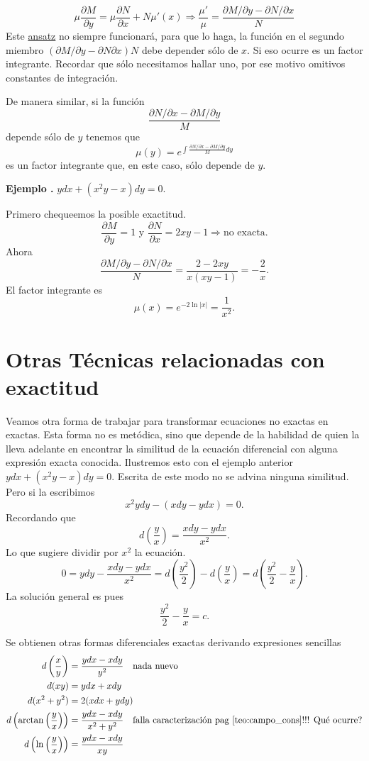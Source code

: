 \documentclass{article}
\newcommand{\der}[2]{\frac{\partial #1}{\partial #2}}
\newcounter{ejemplo_cont}
\newenvironment{ejemplo}{\noindent\textbf{Ejemplo  \arabic{ejemplo_cont}.} }{\addtocounter{ejemplo_cont}{1}}
\begin{document}
\[\mu\der{M}{y}=\mu\der{N}{x}+N\mu'(x) \Longrightarrow\boxed{\frac{\mu'}{\mu}=\frac{\partial M/\partial y-\partial N/\partial x}{N}}\]
Este \href{http://es.wikipedia.org/wiki/Ansatz}{ansatz} no siempre funcionará, para que lo haga,  la función en el segundo miembro $(\partial M/\partial y-\partial N\partial x)N$
debe depender sólo de $x$. Si eso ocurre
es un factor integrante. Recordar que sólo necesitamos hallar uno, por ese motivo omitivos constantes de integración.

De manera similar, si la función
\[\frac{\partial N/\partial x-\partial M/\partial y}{M}\]
depende sólo de $y$ tenemos que
\[\mu(y)=e^{\int \frac{\partial N/\partial x-\partial M/\partial y}{M}dy}\]
es un factor integrante que, en este caso, sólo depende de $y$.

\begin{ejemplo} $ydx+(x^2y-x)dy=0$.
 \end{ejemplo}


Primero chequeemos la posible exactitud.
\[\der{M}{y}=1\text{ y } \der{N}{x}=2xy-1\Longrightarrow\text{no exacta}.\]
Ahora 
\[\frac{\partial M/\partial y-\partial N/\partial x}{N}=\frac{2-2xy}{x(xy-1)}=-\frac{2}{x}.\]
El factor integrante es
\[\mu(x)=e^{-2\ln |x|}=\frac{1}{x^2}.\]




 \section{Otras Técnicas relacionadas con exactitud}

Veamos otra forma de trabajar para transformar ecuaciones no exactas en exactas. Esta forma no es metódica, sino  que depende de la habilidad
de quien la lleva adelante en encontrar la similitud de la ecuación diferencial con alguna expresión exacta conocida. Ilustremos esto con el ejemplo  anterior
$ydx+(x^2y-x)dy=0$. Escrita de este modo no se advina ninguna similitud. Pero si la escribimos
\[x^2ydy-(xdy-ydx)=0.\]
Recordando  que
\[d\left(\frac{y}{x}\right)=\frac{xdy-ydx}{x^2}.\]
Lo que sugiere dividir por $x^2$ la ecuación.
\[0=ydy-\frac{xdy-ydx}{x^2}=d\left(\frac{y^2}{2}\right)-d\left(\frac{y}{x}\right)=d\left(\frac{y^2}{2}-\frac{y}{x}\right).\]
La solución general es pues
\[\frac{y^2}{2}-\frac{y}{x}=c.\]


Se obtienen otras formas diferenciales exactas derivando expresiones sencillas
 \begin{align}
  d\left(\frac{x}{y}\right)&=\frac{ydx-xdy}{y^2}\quad\text{nada nuevo} \\
  d(xy)&=ydx+xdy\\
  d(x^2+y^2)&=2(xdx+ydy)\label{eq:exacta_mod2}\\
  d\left( \arctan\left(\frac{y}{x} \right) \right)&=\frac{ydx-xdy}{x^2+y^2}\quad\text{falla caracterización pag \eqref{teo:campo_cons}!!! Qué ocurre?}\nonumber\\
  d\left( \ln\left(\frac{y}{x} \right) \right)&=\frac{ydx-xdy}{xy}
  \end{align}
\end{document}
